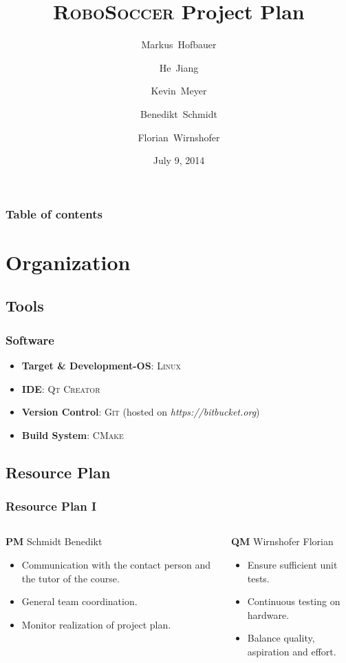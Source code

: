 \documentclass[hyperref={pdfpagelabels=false},compress]{beamer}
\title{\textsc{RoboSoccer} Project Plan}
\author[Hofbauer, Jiang, Meyer, Schmidt, Wirnshofer]{
  Markus~Hofbauer \and
  He~Jiang \and
  Kevin~Meyer \and
  Benedikt~Schmidt \and
  Florian~Wirnshofer
}
\institute
{
	Technische Universität München, Germany
}
\date{July 9, 2014}
\begin{document}
\begin{frame}
	\titlepage
\end{frame}

\begin{frame}
	\frametitle{Table of contents}
	\tableofcontents
\end{frame}

\section{Organization}
\subsection{Tools}
\begin{frame}
	\frametitle{Software}
	\begin{itemize}
		\item  \textbf{Target \& Development-OS}: \textsc{Linux}
		\item  \textbf{IDE}: \textsc{Qt Creator}
		\item  \textbf{Version Control}: \textsc{Git} (hosted on \textit{https://bitbucket.org})
		\item  \textbf{Build System}: \textsc{CMake}
	\end{itemize}
\end{frame}

\subsection{Resource Plan}
\begin{frame}
	\frametitle{Resource Plan I}
	\begin{columns}[t]
		\begin{column}{0.50\textwidth}
			\begin{block}{\textbf{PM} Schmidt Benedikt}
				\begin{itemize}
					\item Communication with the contact person and the tutor of the course.
					\item General team coordination.
					\item Monitor realization of project plan.
				\end{itemize}
			\end{block}
		\end{column}

		\begin{column}{0.50\textwidth}
			\begin{block}{\textbf{QM} Wirnshofer Florian}
				\begin{itemize}
					\item Ensure sufficient unit tests.
					\item Continuous testing on hardware.
					\item Balance quality, aspiration and effort.
				\end{itemize}
			\end{block}
		\end{column}
	\end{columns}
\end{frame}
\end{document}
